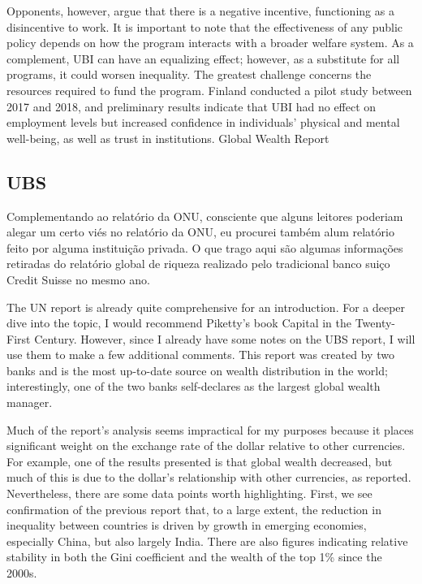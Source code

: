 Opponents, however, argue that there is a negative incentive, functioning as a disincentive to work. It is important to note that the effectiveness of any public policy depends on how the program interacts with a broader welfare system. As a complement, UBI can have an equalizing effect; however, as a substitute for all programs, it could worsen inequality. The greatest challenge concerns the resources required to fund the program. Finland conducted a pilot study between 2017 and 2018, and preliminary results indicate that UBI had no effect on employment levels but increased confidence in individuals' physical and mental well-being, as well as trust in institutions.
Global Wealth Report

\subsection{UBS}
Complementando ao relatório da ONU, consciente que alguns leitores poderiam alegar um certo viés no relatório da ONU, eu procurei também alum relatório feito por alguma instituição privada. O que trago aqui são algumas informações retiradas do relatório global de riqueza  realizado pelo tradicional banco suiço Credit Suisse no mesmo ano\cite{UBS}.

The UN report is already quite comprehensive for an introduction. For a deeper dive into the topic, I would recommend Piketty's book Capital in the Twenty-First Century. However, since I already have some notes on the UBS report, I will use them to make a few additional comments. This report was created by two banks and is the most up-to-date source on wealth distribution in the world; interestingly, one of the two banks self-declares as the largest global wealth manager.

Much of the report's analysis seems impractical for my purposes because it places significant weight on the exchange rate of the dollar relative to other currencies. For example, one of the results presented is that global wealth decreased, but much of this is due to the dollar’s relationship with other currencies, as reported. Nevertheless, there are some data points worth highlighting. First, we see confirmation of the previous report that, to a large extent, the reduction in inequality between countries is driven by growth in emerging economies, especially China, but also largely India. There are also figures indicating relative stability in both the Gini coefficient and the wealth of the top 1\% since the 2000s.

